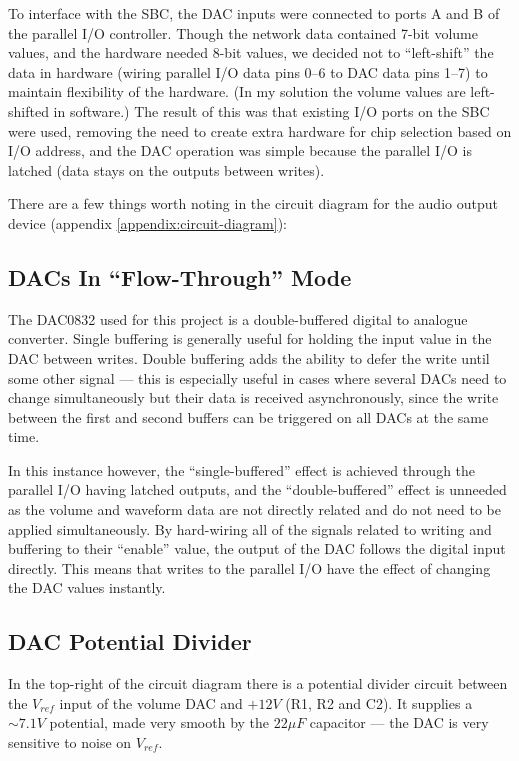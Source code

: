 To interface with the SBC, the DAC inputs were connected to ports A and B of the parallel I/O 
controller.  Though the network data contained 7-bit volume values, and the hardware needed 8-bit 
values, we decided not to ``left-shift'' the data in hardware (wiring parallel I/O data pins 0--6 to 
DAC data pins 1--7) to maintain flexibility of the hardware.  (In my solution the volume values are 
left-shifted in software.)  The result of this was that existing I/O ports on the SBC were used, 
removing the need to create extra hardware for chip selection based on I/O address, and the DAC 
operation was simple because the parallel I/O is latched (data stays on the outputs between writes).

There are a few things worth noting in the circuit diagram for the audio output device (appendix 
\ref{appendix:circuit-diagram}):

\subsection{DACs In ``Flow-Through'' Mode}

The DAC0832 used for this project is a double-buffered digital to analogue converter.  Single 
buffering is generally useful for holding the input value in the DAC between writes.  Double 
buffering adds the ability to defer the write until some other signal --- this is especially useful 
in cases where several DACs need to change simultaneously but their data is received asynchronously, 
since the write between the first and second buffers can be triggered on all DACs at the same time.

In this instance however, the ``single-buffered'' effect is achieved through the parallel I/O having 
latched outputs, and the ``double-buffered'' effect is unneeded as the volume and waveform data are 
not directly related and do not need to be applied simultaneously.  By hard-wiring all of the 
signals related to writing and buffering to their ``enable'' value, the output of the DAC follows 
the digital input directly.  This means that writes to the parallel I/O have the effect of changing 
the DAC values instantly.

\subsection{DAC Potential Divider}

In the top-right of the circuit diagram there is a potential divider circuit between the $V_{ref}$ 
input of the volume DAC and $+12V$ (R1, R2 and C2).  It supplies a $\sim7.1V$ potential, made very 
smooth by the $22\mu{}F$ capacitor --- the DAC is very sensitive to noise on $V_{ref}$.

